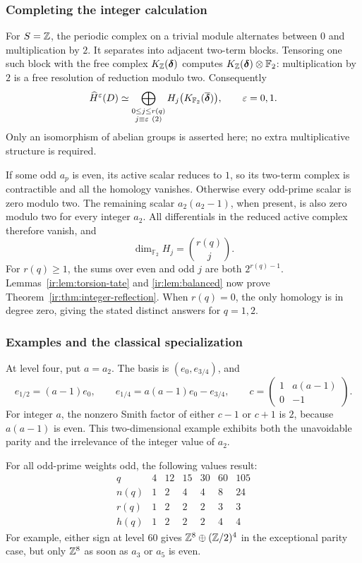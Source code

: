 \subsubsection{Completing the integer calculation}
For $S=\mathbb{Z}$, the periodic complex on a trivial module alternates
between $0$ and multiplication by $2$. It separates into adjacent
two-term blocks. Tensoring one such block with the free complex
$K_{\mathbb{Z}}(\boldsymbol\delta)$ computes
$K_{\mathbb{Z}}(\boldsymbol\delta)\otimes\mathbb F_2$: multiplication by $2$ is a
free resolution of reduction modulo two. Consequently
\begin{equation}\label{ir:eq:integer-tate-koszul}
 \widehat H^\varepsilon(D)\simeq
 \bigoplus_{\substack{0\le j\le r(q)\\j\equiv\varepsilon\ (2)}}
 H_j\bigl(K_{\mathbb F_2}(\overline{\boldsymbol\delta})\bigr),
 \qquad\varepsilon=0,1.
\end{equation}
Only an isomorphism of abelian groups is asserted here; no extra
multiplicative structure is required.

If some odd $a_p$ is even, its active scalar reduces to $1$, so its
two-term complex is contractible and all the homology vanishes.
Otherwise every odd-prime scalar is zero modulo two. The remaining
scalar $a_2(a_2-1)$, when present, is also zero modulo two for every
integer $a_2$. All differentials in the reduced active complex
therefore vanish, and
\[
 \dim_{\mathbb F_2}H_j=\binom{r(q)}j.
\]
For $r(q)\ge1$, the sums over even and odd $j$ are both
$2^{r(q)-1}$. Lemmas~\ref{ir:lem:torsion-tate} and
\ref{ir:lem:balanced} now prove
Theorem~\ref{ir:thm:integer-reflection}. When $r(q)=0$, the only
homology is in degree zero, giving the stated distinct answers for
$q=1,2$.

\subsubsection{Examples and the classical specialization}
At level four, put $a=a_2$. The basis is $(e_0,e_{3/4})$, and
\[
 e_{1/2}=(a-1)e_0,\qquad e_{1/4}=a(a-1)e_0-e_{3/4},
 \qquad
 c=\begin{pmatrix}1&a(a-1)\\0&-1\end{pmatrix}.
\]
For integer $a$, the nonzero Smith factor of either $c-1$ or $c+1$
is $2$, because $a(a-1)$ is even. This two-dimensional example
exhibits both the unavoidable parity and the irrelevance of the
integer value of $a_2$.

For all odd-prime weights odd, the following values result:
\[
\begin{array}{c|rrrrrr}
 q&4&12&15&30&60&105\\\hline
 n(q)&1&2&4&4&8&24\\
 r(q)&1&2&2&2&3&3\\
 h(q)&1&2&2&2&4&4
\end{array}
\]
For example, either sign at level $60$ gives
$\mathbb{Z}^8\oplus(\mathbb{Z}/2)^4$ in the exceptional parity case, but only
$\mathbb{Z}^8$ as soon as $a_3$ or $a_5$ is even.

